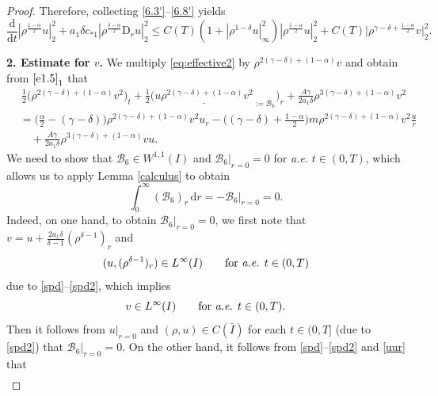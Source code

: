 \documentclass[11pt,reqno]{amsart}
\numberwithin{rk}{section}
\numberwithin{prop}{section}
\numberwithin{mydef}{section}
\numberwithin{lem}{section}
\numberwithin{equation}{section}
\numberwithin{thm}{section}
\begin{document}
\begin{proof}
Therefore, collecting \eqref{6.3'}--\eqref{6.8'} yields
\begin{equation}\label{66}
\frac{\mathrm{d}}{\mathrm{d}t}|\rho^\frac{1-\alpha}{2}u|_2^2+a_1\delta c_{*1} |\rho^\frac{\delta-\alpha}{2}\mathrm{D}_r u|_2^2 \leq C(T)(1+|\rho^{1-\delta}u|_\infty^2) |\rho^\frac{1-\alpha}{2}u|_2^2+C(T)\big|\rho^{\gamma-\delta+\frac{1-\alpha}{2}}v\big|_{2}^{2}.
\end{equation}

\smallskip
\textbf{2. Estimate for $v$.} We multiply \eqref{eq:effective2} by $\rho^{2(\gamma-\delta)+(1-\alpha)}v$ and obtain from $\eqref{e1.5}_1$ that
\begin{equation}\label{duo-v}
\begin{aligned}
&\,\frac{1}{2}\big(\rho^{2(\gamma-\delta)+(1-\alpha)}v^{2}\big)_t+ \frac{1}{2} \big(\underline{u\rho^{2(\gamma-\delta)+(1-\alpha)}v^{2}}_{:=\mathcal{B}_6}\big)_r+\frac{A\gamma}{2a_1\delta}\rho^{3(\gamma-\delta)+(1-\alpha)} v^2\\
&=\big(\frac{\alpha}{2}-(\gamma-\delta)\big)\rho^{2(\gamma-\delta)+(1-\alpha)} v^2 u_r-\big((\gamma-\delta)+\frac{1-\alpha}{2}\big)m\rho^{2(\gamma-\delta)+(1-\alpha)} v^2\frac{u}{r}\\
&\quad +\frac{A\gamma}{2a_1\delta}\rho^{3(\gamma-\delta)+(1-\alpha)}  vu.
\end{aligned}
\end{equation}
We need to show that $\mathcal{B}_6\in W^{1,1}(I)$ and $\mathcal{B}_6|_{r=0}=0$ 
for {\it a.e.} $t\in (0,T)$, which allows us to apply Lemma \ref{calculus} to obtain
\begin{equation}\label{int-B6}
\int_0^\infty (\mathcal{B}_6)_r\,\mathrm{d}r=-\mathcal{B}_6|_{r=0}=0.   
\end{equation}
Indeed, on one hand,  to obtain $\mathcal{B}_6|_{r=0}=0$, we first note that $v=u+\frac{2a_1\delta}{\delta-1}(\rho^{\delta-1})_r$ and
\begin{equation*}
(u,(\rho^{\delta-1})_r)\in L^\infty(I)
\qquad\text{for {\it a.e.} $t\in(0,T)$}
\end{equation*}
due to \eqref{spd}--\eqref{spd2}, which implies  
\begin{equation}\label{psi,wuqiong0}
v\in L^\infty(I)  \qquad\text{for {\it a.e.} $t\in (0,T)$}.
\end{equation}
Then it follows from $u|_{r=0}$ and $(\rho,u) \in C(\bar I)$ for each $t\in (0,T]$ (due to \eqref{spd2}) that $\mathcal{B}_6|_{r=0}=0$. 
On the other hand, it follows from \eqref{spd}--\eqref{spd2} and \eqref{uur} that 
\begin{align*}

\end{align*}
\end{proof}
\end{document}
